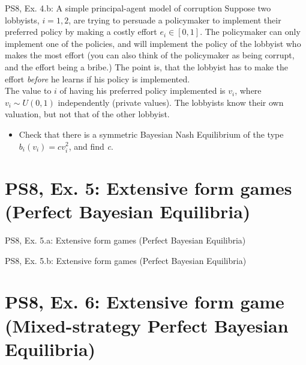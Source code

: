 \begin{frame}{PS8, Ex. 4.b: A simple principal-agent model of corruption}
    Suppose two lobbyists, $i = 1, 2$, are trying to persuade a policymaker to implement their preferred policy by making a costly effort $e_i\in[0, 1]$. The policymaker can only implement one of the policies, and will implement the policy of the lobbyist who makes the most effort (you can also think of the policymaker as being corrupt, and the effort being a bribe.) The point is, that the lobbyist has to make the effort \textit{before} he learns if his policy is implemented.\\\medskip
    The value to $i$ of having his preferred policy implemented is $v_i$, where $v_i\sim U(0, 1)$ independently (private values). The lobbyists know their own valuation, but not that of the other lobbyist.
    \begin{itemize}
      \item[(b)] Check that there is a symmetric Bayesian Nash Equilibrium of the type $b_i(v_i) = cv_i^2$, and find \textit{c}.
    \end{itemize}
    \vspace{-8pt}
    \begin{multicols}{2}
      \vfill\null\columnbreak
      \vfill\null
    \end{multicols}
\end{frame}




\section{PS8, Ex. 5: Extensive form games (Perfect Bayesian Equilibria)}

\begin{frame}{PS8, Ex. 5.a: Extensive form games (Perfect Bayesian Equilibria)}
    \begin{multicols}{2}
      \vfill\null\columnbreak
      \vfill\null
    \end{multicols}
\end{frame}

\begin{frame}{PS8, Ex. 5.b: Extensive form games (Perfect Bayesian Equilibria)}
    \begin{multicols}{2}
      \vfill\null\columnbreak
      \vfill\null
    \end{multicols}
\end{frame}




\section{PS8, Ex. 6: Extensive form game (Mixed-strategy Perfect Bayesian Equilibria)}

